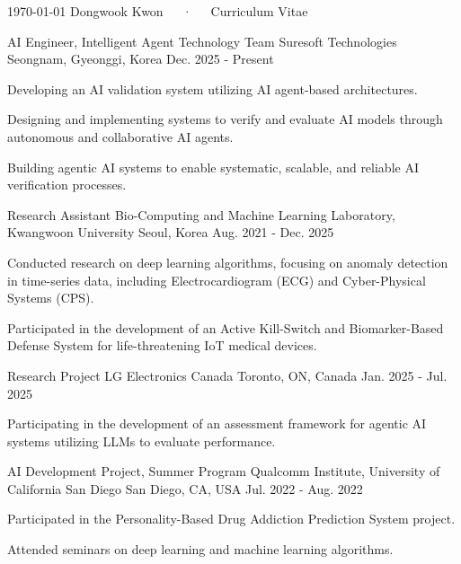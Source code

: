 \documentclass[11pt, letterpaper]{awesome-cv}
\begin{document}
\makecvheader[C]
\makecvfooter
  {\today}
  {Dongwook Kwon~~~·~~~Curriculum Vitae}
  {\thepage}

\begin{cventries}
  \cventry
    {AI Engineer, Intelligent Agent Technology Team}
    {Suresoft Technologies}
    {Seongnam, Gyeonggi, Korea}
    {Dec. 2025 - Present}
    {
      \begin{cvitems}
        \item {Developing an AI validation system utilizing AI agent-based architectures.}
        \item {Designing and implementing systems to verify and evaluate AI models through autonomous and collaborative AI agents.}
        \item {Building agentic AI systems to enable systematic, scalable, and reliable AI verification processes.}
      \end{cvitems}
    }

  \cventry
    {Research Assistant}
    {Bio-Computing and Machine Learning Laboratory, Kwangwoon University}
    {Seoul, Korea}
    {Aug. 2021 - Dec. 2025}
    {
      \begin{cvitems}
        \item {Conducted research on deep learning algorithms, focusing on anomaly detection in time-series data, including Electrocardiogram (ECG) and Cyber-Physical Systems (CPS).}
        \item {Participated in the development of an Active Kill-Switch and Biomarker-Based Defense System for life-threatening IoT medical devices.}
      \end{cvitems}
    }

  \cventry
    {Research Project}
    {LG Electronics Canada}
    {Toronto, ON, Canada}
    {Jan. 2025 - Jul. 2025}
    {
      \begin{cvitems}
        \item {Participating in the development of an assessment framework for agentic AI systems utilizing LLMs to evaluate performance.}
      \end{cvitems}
    }

  \cventry
    {AI Development Project, Summer Program}
    {Qualcomm Institute, University of California San Diego}
    {San Diego, CA, USA}
    {Jul. 2022 - Aug. 2022}
    {
      \begin{cvitems}
        \item {Participated in the Personality-Based Drug Addiction Prediction System project.}
        \item {Attended seminars on deep learning and machine learning algorithms.}
      \end{cvitems}
    }
\end{cventries}
\end{document}
